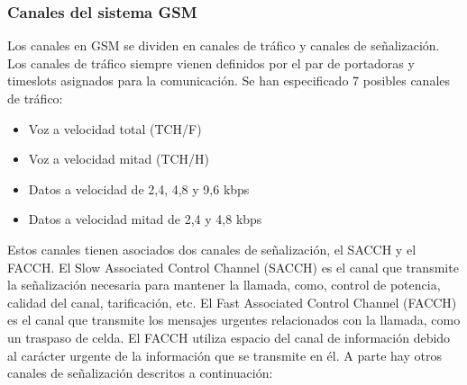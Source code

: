 \subsubsection{Canales del sistema \acrshort{GSM}}
\label{ssub:canalesGSM}
Los canales en \acrshort{GSM} se dividen en canales de tráfico y canales de señalización. Los canales de tráfico siempre vienen definidos por el par de portadoras y timeslots asignados para la comunicación. Se han especificado 7 posibles canales de tráfico:
\begin{itemize}
	\item Voz a velocidad total (TCH/F)
	\item Voz a velocidad mitad (TCH/H)
	\item Datos a velocidad de 2,4, 4,8 y 9,6 kbps
	\item Datos a velocidad mitad de 2,4 y 4,8 kbps
\end{itemize}
Estos canales tienen asociados dos canales de señalización, el \acrshort{SACCH} y el \acrshort{FACCH}. El Slow Associated Control Channel (\acrshort{SACCH}) es el canal que transmite la señalización necesaria para mantener la llamada, como, control de potencia, calidad del canal, tarificación, etc. El Fast Associated Control Channel (\acrshort{FACCH}) es el canal que transmite los mensajes urgentes relacionados con la llamada, como un traspaso de celda. El \acrshort{FACCH} utiliza espacio del canal de información debido al carácter urgente de la información que se transmite en él. A parte hay otros canales de señalización descritos a continuación:

